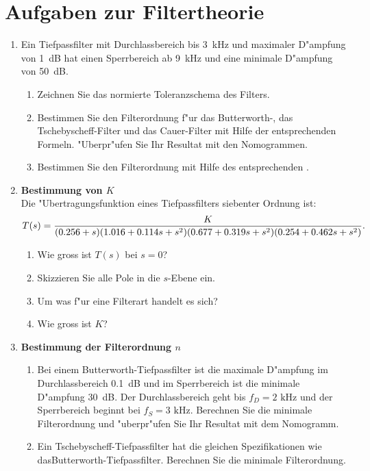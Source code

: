 \section{Aufgaben zur Filtertheorie}
\begin{enumerate}
\item Ein Tiefpassfilter mit Durchlassbereich bis 3~kHz und maximaler
  D"ampfung von 1~dB hat einen Sperrbereich ab 9~kHz und eine minimale D"ampfung von 50~dB.
\begin{enumerate}
 \item Zeichnen Sie das normierte Toleranzschema des Filters.
 \item Bestimmen Sie den Filterordnung f"ur das Butterworth-, das Tschebyscheff-Filter und das Cauer-Filter mit Hilfe der entsprechenden Formeln. "Uberpr"ufen Sie Ihr Resultat mit den Nomogrammen. 
\item Bestimmen Sie den Filterordnung mit Hilfe des entsprechenden \mb\!\!.
\end{enumerate} 

\item {\bf Bestimmung von $K$}\\ Die "Ubertragungsfunktion eines
  Tiefpassfilters siebenter Ordnung ist:
\begin{equation*}
{\footnotesize T(s)=\frac{K}{(0.256+s)(1.016+0.114s+s^2)(0.677+0.319s+s^2)(0.254+0.462s+s^2)}.}
\end{equation*}
  \begin{enumerate}
  \item Wie gross ist $T(s)$ bei $s=0$?
  \item Skizzieren Sie alle Pole in die $s$-Ebene ein.
  \item Um was f"ur eine Filterart handelt es sich?
  \item Wie gross ist $K$?
  \end{enumerate} 
  
\item {\bf Bestimmung der Filterordnung $n$}
\begin{enumerate}
\item Bei einem Butterworth-Tiefpassfilter ist die maximale D"ampfung
  im Durchlassbereich 0.1~dB und im Sperrbereich ist die minimale
  D"ampfung 30~dB. Der Durchlassbereich geht bis $f_D=2\mbox{~kHz}$ und der
  Sperrbereich beginnt bei $f_S=3\mbox{~kHz}$. Berechnen Sie die minimale
  Filterordnung und "uberpr"ufen Sie Ihr Resultat mit dem Nomogramm.
\item Ein Tschebyscheff-Tiefpassfilter hat die gleichen
  Spezifikationen wie das\newline Butterworth-Tief\-pass\-filter. Berechnen Sie die
  minimale Filterordnung.
\end{enumerate}


\end{enumerate}
